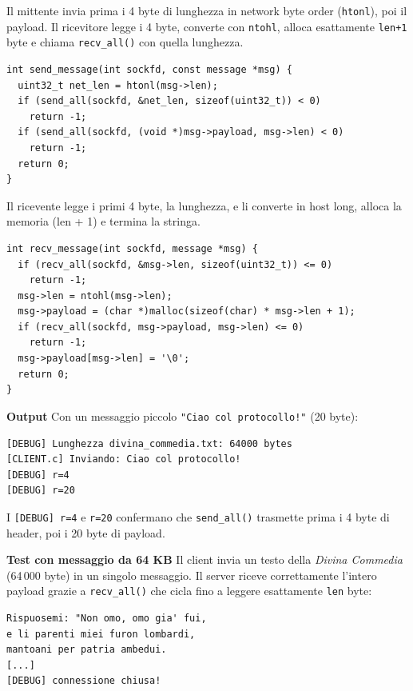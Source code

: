 \documentclass[a4paper,12pt]{article}
\begin{document}
Il mittente invia prima i 4 byte di lunghezza in network byte order (\texttt{htonl}),
poi il payload. Il ricevitore legge i 4 byte, converte con \texttt{ntohl}, alloca
esattamente \texttt{len+1} byte e chiama \texttt{recv\_all()} con quella lunghezza.

\begin{lstlisting}[caption={send\_message() -- client}]
int send_message(int sockfd, const message *msg) {
  uint32_t net_len = htonl(msg->len);
  if (send_all(sockfd, &net_len, sizeof(uint32_t)) < 0)
    return -1;
  if (send_all(sockfd, (void *)msg->payload, msg->len) < 0)
    return -1;
  return 0;
}
\end{lstlisting}

Il ricevente legge i primi 4 byte, la lunghezza, e li converte in host long,
alloca la memoria (len + 1) e termina la stringa.

\begin{lstlisting}[caption={recv\_message() -- server}]
int recv_message(int sockfd, message *msg) {
  if (recv_all(sockfd, &msg->len, sizeof(uint32_t)) <= 0)
    return -1;
  msg->len = ntohl(msg->len);
  msg->payload = (char *)malloc(sizeof(char) * msg->len + 1);
  if (recv_all(sockfd, msg->payload, msg->len) <= 0)
    return -1;
  msg->payload[msg->len] = '\0';
  return 0;
}
\end{lstlisting}

\textbf{Output} Con un messaggio piccolo \texttt{"Ciao col protocollo!"} (20 byte):

\begin{lstlisting}[caption={Output -- messaggio piccolo}, language={}]
[DEBUG] Lunghezza divina_commedia.txt: 64000 bytes
[CLIENT.c] Inviando: Ciao col protocollo!
[DEBUG] r=4
[DEBUG] r=20
\end{lstlisting}

I \texttt{[DEBUG] r=4} e \texttt{r=20} confermano che \texttt{send\_all()} trasmette prima
i 4 byte di header, poi i 20 byte di payload.

\textbf{Test con messaggio da 64 KB} Il client invia un testo della \textit{Divina Commedia}
(64\,000 byte) in un singolo messaggio. Il server riceve correttamente l'intero payload
grazie a \texttt{recv\_all()} che cicla fino a leggere esattamente \texttt{len} byte:

\begin{lstlisting}[caption={Output server -- payload 64 KB}, language={}]
Rispuosemi: "Non omo, omo gia' fui,
e li parenti miei furon lombardi,
mantoani per patria ambedui.
[...]
[DEBUG] connessione chiusa!
\end{lstlisting}
\end{document}
